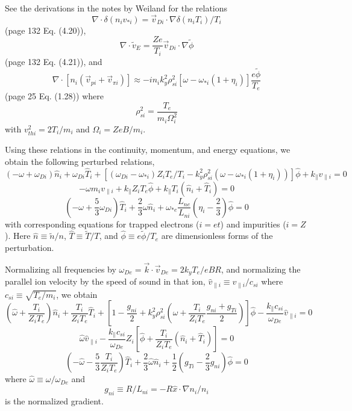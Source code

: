 See the derivations in the notes by Weiland\cite{weil92a} for
the relations
\[ \nabla \cdot \delta ( {n_i v_{*i}} ) 
 = \vec{v}_{Di} \cdot \nabla \delta ( {n_i T_i} ) / T_i \]
(page 132 Eq. (4.20)),
\[ \nabla \cdot \tilde{v}_E
   = \frac{Z e}{T_i} \vec{v}_{Di} \cdot \nabla \tilde{\phi} \]
(page 132 Eq. (4.21)), and
\[ \nabla \cdot [ n_i ( \vec{v}_{pi} + \vec{v}_{\pi i} ) ]
 \approx - i n_i k_y^2 \rho_{si}^2
 [ \omega - \omega_{*i} ( 1 + \eta_i ) ] \frac{e \tilde{\phi}}{T_e} \]
(page 25 Eq. (1.28)) where
\[ \rho_{si}^2 = \frac{T_e}{m_i \Omega_i^2} \]
with $ v_{thi}^2 = 2 T_i / m_i $ and $ \Omega_i = Z e B / m_i $.

Using these relations in the continuity, momentum, and energy equations, 
we obtain the following perturbed relations,
\[ (-\omega + \omega_{Di}) \hat{n}_i + \omega_{Di} \hat{T}_i
 + [ ( \omega_{Di} - \omega_{*i} ) Z_i T_e/T_i
 - k_y^2 \rho_{si}^2 ( \omega - \omega_{*i} ( 1 + \eta_i ) )
 ] \hat{\phi} + k_\parallel v_{\parallel i} = 0 \]
\[ - \omega m_i v_{\parallel i} + k_\parallel Z_i T_e \hat{\phi}
 + k_\parallel T_i ( \hat{n}_i + \hat{T}_i ) = 0 \]
\[ (-\omega + \frac{5}{3} \omega_{Di} ) \hat{T}_i
   + \frac{2}{3} \omega \hat{n}_i
   + \omega_{*e} \frac{L_{ne}}{L_{ni}}
   ( \eta_i - \frac{2}{3} ) \hat{\phi} = 0 \]
with corresponding equations for trapped electrons ($i=et$)
and impurities ($i=Z$).
Here $\hat{n} \equiv \tilde{n} / n$, 
$\hat{T} \equiv \tilde{T} / T$, and
$\hat{\phi} \equiv e \tilde{\phi} / T_e$ are dimensionless forms
of the perturbation.

Normalizing all frequencies by 
$\omega_{De} = \vec{k} \cdot \vec{v}_{De} = 2 k_y T_e /  e B R $,
and normalizing the parallel ion velocity by the speed of sound 
in that ion,
$ \hat{v}_{\parallel i} \equiv v_{\parallel i} / c_{si} $ 
where $ c_{si} \equiv \sqrt{T_e / m_i} $,
we obtain
\[ ( \hat{\omega} + \frac{T_i}{Z_i T_e} ) \hat{n}_i
  + \frac{T_i}{Z_i T_e} \hat{T}_i
  + \left[ 1 - \frac{g_{ni}}{2}
  + k_y^2 \rho_{si}^2 \left( \hat{\omega}
    + \frac{T_i}{Z_i T_e} \frac{g_{ni}+g_{Ti}}{2}
    \right) \right] \hat{\phi}
  - \frac{k_\parallel c_{si}}{\omega_{De}} \hat{v}_{\parallel i}
  = 0 \]
\[ \hat{\omega} \hat{v}_{\parallel i}
 - \frac{k_\parallel c_{si}}{\omega_{De}} Z_i \left[ \hat{\phi}
   + \frac{T_i}{Z_i T_e} ( \hat{n}_i + \hat{T}_i ) \right] = 0 \]
\[ \left( - \hat{\omega} - \frac{5}{3} \frac{T_i}{Z_i T_e}
   \right) \hat{T}_i + \frac{2}{3} \hat{\omega} \hat{n}_i
   + \frac{1}{2} \left( g_{Ti} - \frac{2}{3} g_{ni}
     \right) \hat{\phi} = 0 \]
where $ \hat{\omega} \equiv \omega / \omega_{De} $
and
\[ g_{ni} \equiv R / L_{ni} = - R \hat{x} \cdot \nabla n_i / n_i \]
is the normalized gradient.

